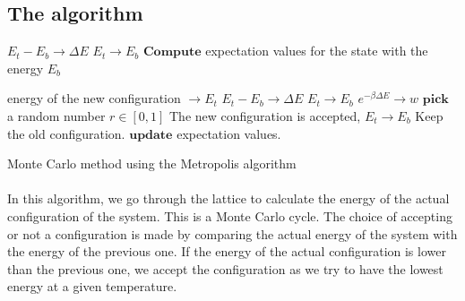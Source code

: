 \documentclass[a4paper, twoside, 11pt]{report}
\theoremstyle{theorem}
\theoremstyle{remark}
\theoremstyle{exemple}
\begin{document}
        \subsection{The algorithm}
        
            \begin{center}
            \begin{algorithm}[H]
            
            \SetAlgoLined
            
                $E_t - E_b \rightarrow \Delta E$\;
		$E_t \rightarrow E_b$\;
		$\textbf{Compute}$ expectation values for the state with the energy $E_b$\;
		
                    {
                        energy of the new configuration $\rightarrow E_t$\;
		        $E_t - E_b \rightarrow \Delta E$\;
                        {
                            $E_t \rightarrow E_b$\;
                        }{
                            $e^{-\beta \Delta E} \rightarrow w$\;
		            $\textbf{pick}$ a random number $r \in [0,1]$\;
                            {
                                The new configuration is accepted, $E_t \rightarrow E_b$\;
                            }{
                                Keep the old configuration.\;
                            }
                        }
                        $\textbf{update}$ expectation values.\;
                    } 
                  
            \caption{Monte Carlo method using the Metropolis algorithm}  
            \end{algorithm}
            \end{center}
            
            \paragraph{}In this algorithm, we go through the lattice to calculate the energy of the actual configuration of the system. This is a Monte Carlo cycle. The choice of accepting or not a configuration is made by comparing the actual energy of the system with the energy of the previous one. If the energy of the actual configuration is lower than the previous one, we accept the configuration as we try to have the lowest energy at a given temperature.
            
\end{document}
